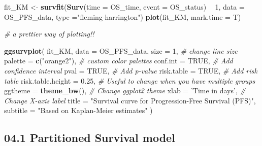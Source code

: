 \documentclass[
]{article}
\newenvironment{Shaded}{\begin{snugshade}}{\end{snugshade}}
\newcommand{\CommentTok}[1]{\textcolor[rgb]{0.56,0.35,0.01}{\textit{#1}}}
\newcommand{\DataTypeTok}[1]{\textcolor[rgb]{0.13,0.29,0.53}{#1}}
\newcommand{\DecValTok}[1]{\textcolor[rgb]{0.00,0.00,0.81}{#1}}
\newcommand{\FloatTok}[1]{\textcolor[rgb]{0.00,0.00,0.81}{#1}}
\newcommand{\KeywordTok}[1]{\textcolor[rgb]{0.13,0.29,0.53}{\textbf{#1}}}
\newcommand{\NormalTok}[1]{#1}
\newcommand{\OperatorTok}[1]{\textcolor[rgb]{0.81,0.36,0.00}{\textbf{#1}}}
\newcommand{\OtherTok}[1]{\textcolor[rgb]{0.56,0.35,0.01}{#1}}
\newcommand{\StringTok}[1]{\textcolor[rgb]{0.31,0.60,0.02}{#1}}
\begin{document}
\begin{Shaded}
\begin{Highlighting}[]
\NormalTok{fit_KM   <-}\StringTok{ }\KeywordTok{survfit}\NormalTok{(}\KeywordTok{Surv}\NormalTok{(}\DataTypeTok{time =}\NormalTok{ OS_time, }\DataTypeTok{event =}\NormalTok{ OS_status) }\OperatorTok{~}\StringTok{ }\DecValTok{1}\NormalTok{, }\DataTypeTok{data =}\NormalTok{ OS_PFS_data, }
                         \DataTypeTok{type =}\StringTok{"fleming-harrington"}\NormalTok{)}
\KeywordTok{plot}\NormalTok{(fit_KM, }\DataTypeTok{mark.time =}\NormalTok{ T)}


\CommentTok{# a prettier way of plotting!!}

\KeywordTok{ggsurvplot}\NormalTok{(}
\NormalTok{  fit_KM, }
  \DataTypeTok{data =}\NormalTok{ OS_PFS_data, }
  \DataTypeTok{size =} \DecValTok{1}\NormalTok{,                  }\CommentTok{# change line size}
  \DataTypeTok{palette =} \KeywordTok{c}\NormalTok{(}\StringTok{"orange2"}\NormalTok{),    }\CommentTok{# custom color palettes}
  \DataTypeTok{conf.int =} \OtherTok{TRUE}\NormalTok{,           }\CommentTok{# Add confidence interval}
  \DataTypeTok{pval =} \OtherTok{TRUE}\NormalTok{,               }\CommentTok{# Add p-value}
  \DataTypeTok{risk.table =} \OtherTok{TRUE}\NormalTok{,         }\CommentTok{# Add risk table}
  \DataTypeTok{risk.table.height =} \FloatTok{0.25}\NormalTok{,  }\CommentTok{# Useful to change when you have multiple groups}
  \DataTypeTok{ggtheme =} \KeywordTok{theme_bw}\NormalTok{(),      }\CommentTok{# Change ggplot2 theme}
  \DataTypeTok{xlab =} \StringTok{'Time in days'}\NormalTok{,     }\CommentTok{# Change X-axis label}
  \DataTypeTok{title    =} \StringTok{"Survival curve for Progression-Free Survival (PFS)"}\NormalTok{, }
  \DataTypeTok{subtitle =} \StringTok{"Based on Kaplan-Meier estimates"}
\NormalTok{) }
\end{Highlighting}
\end{Shaded}

\hypertarget{partitioned-survival-model}{%
\subsection{04.1 Partitioned Survival
model}\label{partitioned-survival-model}}
\end{document}
